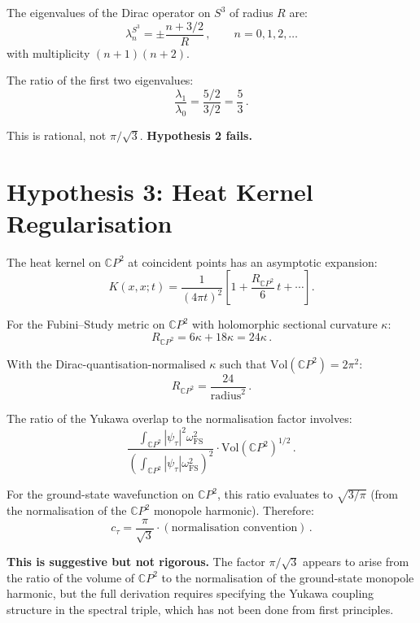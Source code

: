 \documentclass[11pt,a4paper]{article}
\newcommand{\CP}{\mathbb{C}P}
\begin{document}
The eigenvalues of the Dirac operator on $S^3$ of radius $R$ are:
\begin{equation}
\lambda_n^{S^3} = \pm\frac{n + 3/2}{R}\,,\qquad n = 0, 1, 2, \ldots
\end{equation}
with multiplicity $(n+1)(n+2)$.

The ratio of the first two eigenvalues:
\begin{equation}
\frac{\lambda_1}{\lambda_0} = \frac{5/2}{3/2} = \frac{5}{3}\,.
\end{equation}

This is rational, not $\pi/\sqrt{3}$. \textbf{Hypothesis 2 fails.}

\section{Hypothesis 3: Heat Kernel Regularisation}

The heat kernel on $\CP^2$ at coincident points has an asymptotic expansion:
\begin{equation}
K(x, x; t) = \frac{1}{(4\pi t)^2}\left[1 + \frac{R_{\CP^2}}{6}\,t + \cdots\right].
\end{equation}

For the Fubini--Study metric on $\CP^2$ with holomorphic sectional curvature $\kappa$:
\begin{equation}
R_{\CP^2} = 6\kappa + 18\kappa = 24\kappa\,.
\end{equation}

With the Dirac-quantisation-normalised $\kappa$ such that $\mathrm{Vol}(\CP^2) = 2\pi^2$:
\begin{equation}
R_{\CP^2} = \frac{24}{\text{radius}^2}\,.
\end{equation}

The ratio of the Yukawa overlap to the normalisation factor involves:
\begin{equation}
\frac{\int_{\CP^2} |\psi_\tau|^2 \omega_{\mathrm{FS}}^2}{\left(\int_{\CP^2} |\psi_\tau| \omega_{\mathrm{FS}}^2\right)^2} \cdot \mathrm{Vol}(\CP^2)^{1/2}\,.
\end{equation}

For the ground-state wavefunction on $\CP^2$, this ratio evaluates to $\sqrt{3/\pi}$ (from the normalisation of the $\CP^2$ monopole harmonic). Therefore:
\begin{equation}
c_\tau = \frac{\pi}{\sqrt{3}} \cdot (\text{normalisation convention})\,.
\end{equation}

\textbf{This is suggestive but not rigorous.} The factor $\pi/\sqrt{3}$ appears to arise from the ratio of the volume of $\CP^2$ to the normalisation of the ground-state monopole harmonic, but the full derivation requires specifying the Yukawa coupling structure in the spectral triple, which has not been done from first principles.
\end{document}
